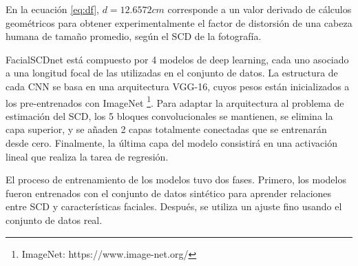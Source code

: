 En la ecuación \ref{eq:df}, $d = 12.6572 cm$ corresponde a un valor derivado de cálculos geométricos \cite{23} para obtener experimentalmente el factor de distorsión de una cabeza humana de tamaño promedio, según el SCD de la fotografía.

FacialSCDnet está compuesto por 4 modelos de deep learning, cada uno asociado a una longitud focal de las utilizadas en el conjunto de datos. La estructura de cada CNN se basa en una arquitectura VGG-16, cuyos pesos están inicializados a los pre-entrenados con ImageNet \footnote{ImageNet: https://www.image-net.org/}. Para adaptar la arquitectura al problema de estimación del SCD, los 5 bloques convolucionales se mantienen, se elimina la capa superior, y se añaden 2 capas totalmente conectadas que se entrenarán desde cero. Finalmente, la última capa del modelo consistirá en una activación lineal que realiza la tarea de regresión.

El proceso de entrenamiento de los modelos tuvo dos fases. Primero, los modelos fueron entrenados con el conjunto de datos sintético para aprender relaciones entre SCD y características faciales. Después, se utiliza un ajuste fino usando el conjunto de datos real.




